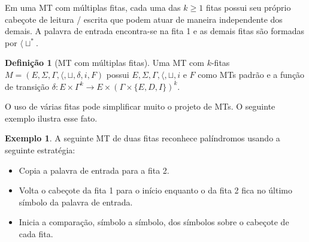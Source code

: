 \documentclass[a4paper]{article}
\theoremstyle{definition}
\newtheorem{Example}{Exemplo}
\newtheorem{Definition}{Definição}
\begin{document}
  Em uma MT com múltiplas fitas, cada uma das $k\geq 1$ fitas possui seu próprio
  cabeçote de leitura / escrita que podem atuar de maneira independente dos
  demais. A palavra de entrada encontra-se na fita 1 e as demais fitas são
  formadas por $\langle \sqcup^*$.

  \begin{Definition}[MT com múltiplas fitas]
    Uma MT com $k$-fitas $M = (E,\Sigma,\Gamma,\langle, \sqcup, \delta,i, F)$
    possui $E,\Sigma,\Gamma,\langle, \sqcup, i$ e $F$ como MTs padrão e a função
    de transição $\delta : E \times \Gamma^k \to E \times (\Gamma \times \{E,D,I\})^k$.
  \end{Definition}

  O uso de várias fitas pode simplificar muito o projeto de MTs. O seguinte
  exemplo ilustra esse fato.

  \begin{Example}
    A seguinte MT de duas fitas reconhece palíndromos usando a seguinte
    estratégia:
    \begin{itemize}
      \item Copia a palavra de entrada para a fita 2.
      \item Volta o cabeçote da fita 1 para o início enquanto o da fita 2 fica
        no último símbolo da palavra de entrada.
      \item Inicia a comparação, símbolo a símbolo, dos símbolos sobre o
        cabeçote de cada fita.
      \end{itemize}
      \begin{figure}[H]
        \centering
      \end{figure}
  \end{Example}
\end{document}
